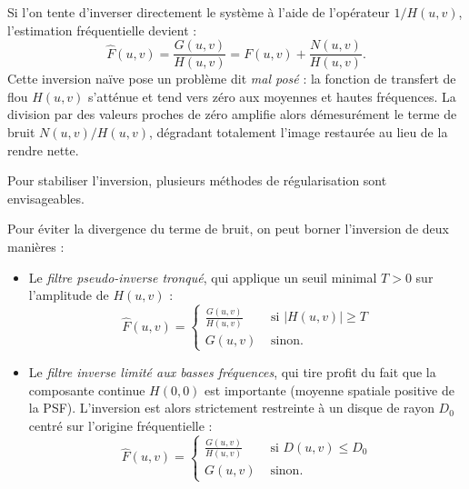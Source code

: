 Si l'on tente d'inverser directement le système à l'aide de l'opérateur $1 / H(u,v)$, l'estimation fréquentielle devient :
\begin{equation}
    \hat{F}(u,v) = \frac{G(u,v)}{H(u,v)} = F(u,v) + \frac{N(u,v)}{H(u,v)}.
\end{equation}
Cette inversion naïve pose un problème dit \emph{mal posé} : la fonction de transfert de flou $H(u,v)$ s'atténue et tend vers zéro aux moyennes et hautes fréquences. La division par des valeurs proches de zéro amplifie alors démesurément le terme de bruit $N(u,v) / H(u,v)$, dégradant totalement l'image restaurée au lieu de la rendre nette. 

Pour stabiliser l'inversion, plusieurs méthodes de régularisation sont envisageables.

\begin{proposition}
    Pour éviter la divergence du terme de bruit, on peut borner l'inversion de deux manières :
    \begin{itemize}
        \item Le \emph{filtre pseudo-inverse tronqué}, qui applique un seuil minimal $T > 0$ sur l'amplitude de $H(u,v)$ :
            \begin{equation}
                \hat{F}(u,v) = 
                \begin{cases}
                    \displaystyle \frac{G(u,v)}{H(u,v)} & \text{ si } |H(u,v)| \geqslant T \\
                    G(u,v) & \text{ sinon}.
                \end{cases}
            \end{equation}
        \item Le \emph{filtre inverse limité aux basses fréquences}, qui tire profit du fait que la composante continue $H(0,0)$ est importante (moyenne spatiale positive de la PSF). L'inversion est alors strictement restreinte à un disque de rayon $D_0$ centré sur l'origine fréquentielle :
            \begin{equation}
                \hat{F}(u,v) = 
                \begin{cases}
                    \displaystyle \frac{G(u,v)}{H(u,v)} & \text{ si } D(u,v) \leqslant D_0 \\
                    G(u,v) & \text{ sinon}.
                \end{cases}
            \end{equation}
    \end{itemize}
\end{proposition}

